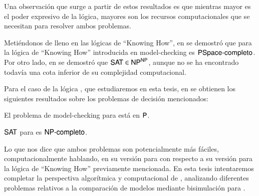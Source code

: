 Una observación que surge a partir de estos resultados es que mientras mayor es el poder expresivo de la lógica, mayores son los recursos 
computacionales que se necesitan para resolver ambos problemas.

Metiéndonos de lleno en las lógicas de ``Knowing How'', en \cite{Demri_Fervari_2023} se demostró que para la lógica de ``Knowing How'' introducida 
en \cite{Wang15KH,Wang2018GoalDirectedKH} model-checking es $\rm\textsf{PSpace-completo}$. Por otro lado, en \cite{SAT_Upper_Bound} se demostró que 
$\rm\textsf{SAT} \in \rm\textsf{NP}^{\rm\textsf{NP}}$, aunque no se ha encontrado todavía una cota inferior de su complejidad computacional.

Para el caso de la lógica \KHilogic, que estudiaremos en esta tesis, en \cite{ArecesFSV25,SaraviaPHD} se obtienen los siguientes resultados 
sobre los problemas de decisión mencionados:

\begin{teorema}\label{thm:model-checking-poly}
    El problema de model-checking para \KHilogic está en $\rm\textsf{P}$.
\end{teorema}

\begin{teorema}
    $\rm\textsf{SAT}$ para \KHilogic es $\rm\textsf{NP-completo}$.
\end{teorema}

Lo que nos dice que ambos problemas son potencialmente más fáciles, computacionalmente hablando, en su versión para \KHilogic con respecto a 
su versión para la lógica de ``Knowing How'' previamente mencionada. En esta tesis intentaremos completar la perspectiva algorítmica y 
computacional de \KHilogic, analizando diferentes problemas relativos a la comparación de modelos mediante bisimulación para \KHilogic. 
